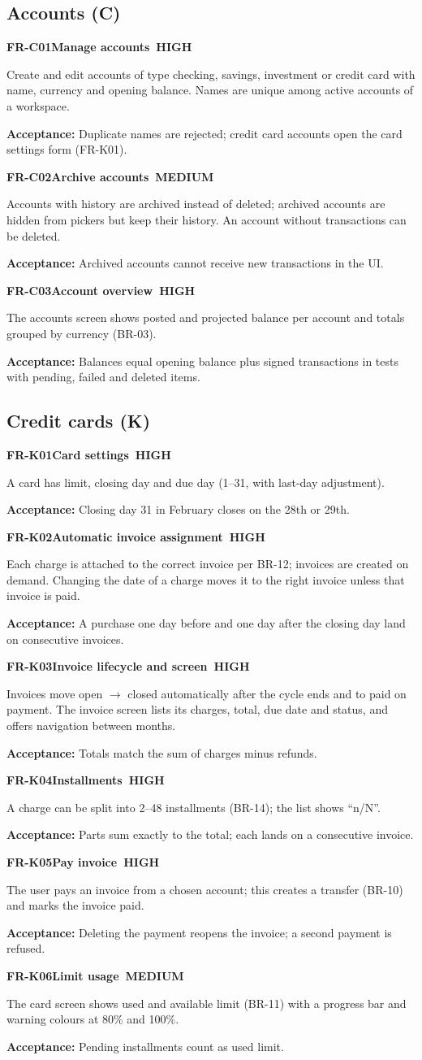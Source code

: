 \documentclass[11pt,a4paper]{article}
\newcommand{\PH}{\colorbox{finlyblue}{\color{white}\scriptsize\bfseries\ HIGH\ }}
\newcommand{\PM}{\colorbox{finlygold}{\color{finlydark}\scriptsize\bfseries\ MEDIUM\ }}
\newcommand{\req}[5]{%
  \begin{tcolorbox}[reqbox]
    {\small\textbf{\textcolor{finlyblue}{#1}}\quad\textbf{#2}\hfill #3}\par\vspace{2pt}
    {\small #4}\par\vspace{2pt}
    {\footnotesize\textcolor{finlytext}{\textbf{Acceptance:} #5}}
  \end{tcolorbox}}
\begin{document}
\subsection{Accounts (C)}
\req{FR-C01}{Manage accounts}{\PH}{Create and edit accounts of type checking, savings, investment or credit card with name, currency and opening balance. Names are unique among active accounts of a workspace.}
{Duplicate names are rejected; credit card accounts open the card settings form (FR-K01).}
\req{FR-C02}{Archive accounts}{\PM}{Accounts with history are archived instead of deleted; archived accounts are hidden from pickers but keep their history. An account without transactions can be deleted.}
{Archived accounts cannot receive new transactions in the UI.}
\req{FR-C03}{Account overview}{\PH}{The accounts screen shows posted and projected balance per account and totals grouped by currency (BR-03).}
{Balances equal opening balance plus signed transactions in tests with pending, failed and deleted items.}

\subsection{Credit cards (K)}
\req{FR-K01}{Card settings}{\PH}{A card has limit, closing day and due day (1--31, with last-day adjustment).}
{Closing day 31 in February closes on the 28th or 29th.}
\req{FR-K02}{Automatic invoice assignment}{\PH}{Each charge is attached to the correct invoice per BR-12; invoices are created on demand. Changing the date of a charge moves it to the right invoice unless that invoice is paid.}
{A purchase one day before and one day after the closing day land on consecutive invoices.}
\req{FR-K03}{Invoice lifecycle and screen}{\PH}{Invoices move open $\rightarrow$ closed automatically after the cycle ends and to paid on payment. The invoice screen lists its charges, total, due date and status, and offers navigation between months.}
{Totals match the sum of charges minus refunds.}
\req{FR-K04}{Installments}{\PH}{A charge can be split into 2--48 installments (BR-14); the list shows ``n/N''.}
{Parts sum exactly to the total; each lands on a consecutive invoice.}
\req{FR-K05}{Pay invoice}{\PH}{The user pays an invoice from a chosen account; this creates a transfer (BR-10) and marks the invoice paid.}
{Deleting the payment reopens the invoice; a second payment is refused.}
\req{FR-K06}{Limit usage}{\PM}{The card screen shows used and available limit (BR-11) with a progress bar and warning colours at 80\% and 100\%.}
{Pending installments count as used limit.}
\end{document}

